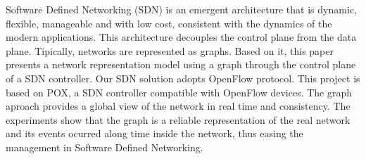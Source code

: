 
Software Defined Networking (SDN) is an emergent architecture
that is dynamic, flexible, manageable and with low cost, 
consistent with the dynamics of the modern applications.
This architecture decouples the control plane from the data plane.
Tipically, networks are represented as graphs.
Based on it, this paper presents a network 
representation model using a graph through the control plane 
of a SDN controller.
Our SDN solution adopts OpenFlow protocol.
This project is based on POX, a SDN controller compatible 
with OpenFlow devices.
The graph aproach provides a global view of the network in real 
time and consistency.
The experiments show that the graph is a reliable representation of 
the real network and its events ocurred along time inside the network,
thus easing the management in Software Defined Networking.

